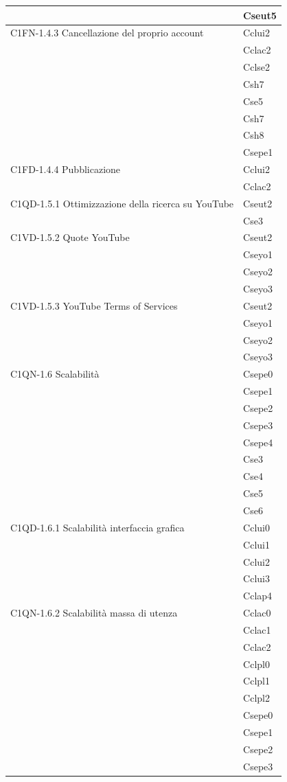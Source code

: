 \begin{footnotesize}
\begin{longtable}[!h]{|l|l|}
& Cseut5\\\hline  
C1FN-1.4.3 Cancellazione del proprio account & Cclui2\\
& Cclac2\\
& Cclse2\\
& Csh7\\
& Cse5\\
& Csh7\\
& Csh8\\
& Csepe1\\\hline  
C1FD-1.4.4 Pubblicazione & Cclui2\\
& Cclac2\\\hline 
C1QD-1.5.1 Ottimizzazione della ricerca su YouTube & Cseut2\\
& Cse3\\\hline 
C1VD-1.5.2 Quote YouTube & Cseut2\\
& Cseyo1\\
& Cseyo2\\
& Cseyo3\\\hline 
C1VD-1.5.3 YouTube Terms of Services & Cseut2\\
& Cseyo1\\
& Cseyo2\\
& Cseyo3\\\hline  
C1QN-1.6 Scalabilit\`a & Csepe0\\
& Csepe1\\
& Csepe2\\
& Csepe3\\
& Csepe4\\
& Cse3\\
& Cse4\\
& Cse5\\
& Cse6\\\hline   
C1QD-1.6.1 Scalabilit\`a interfaccia grafica  & Cclui0\\ 
& Cclui1\\
& Cclui2\\
& Cclui3\\
& Cclap4\\\hline 
C1QN-1.6.2 Scalabilit\`a massa di utenza & Cclac0\\
& Cclac1\\
& Cclac2\\
& Cclpl0\\
& Cclpl1\\
& Cclpl2\\
& Csepe0\\
& Csepe1\\
& Csepe2\\
& Csepe3\\

\end{longtable}
\end{footnotesize}
